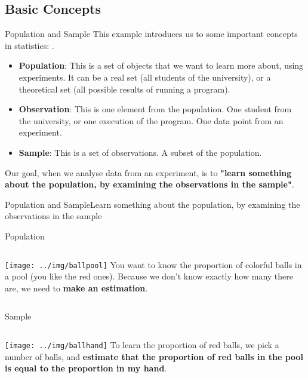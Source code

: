 \subsection{Basic Concepts}
\begin{frame}{Population and Sample}
  This example introduces us to some important concepts in statistics:
  .\bigskip

  \begin{itemize}
    \item {\bf Population}: This is a set of objects that we want to learn more about, using experiments. It can be a real set (all students of the university), or a theoretical set (all possible results of running a program).

    \item {\bf Observation}: This is one element from the population. One student from the university, or one execution of the program. One data point from an experiment.\medskip

    \item {\bf Sample}: This is a set of observations. A subset of the population.
  \end{itemize}
  \bigskip

  Our goal, when we analyse data from an experiment, is to {\bf "learn something about the population, by examining the observations in the sample"}.
\end{frame}

\begin{frame}{Population and Sample}{Learn something about the population, by examining the observations in the sample}
  \begin{block}{Population}
    \begin{columns}
      \texttt{[image: ../img/ballpool]}
      You want to know the proportion of colorful balls in a pool (you like the red ones). Because we don't know exactly how many there are, we need to {\bf make an estimation}.
    \end{columns}
  \end{block}
  \begin{block}{Sample}
    \begin{columns}
      \texttt{[image: ../img/ballhand]}
      To learn the proportion of red balls, we pick a number of balls, and {\bf estimate that the proportion of red balls in the pool is equal to the proportion in my hand}.
    \end{columns}
  \end{block}
\end{frame}

